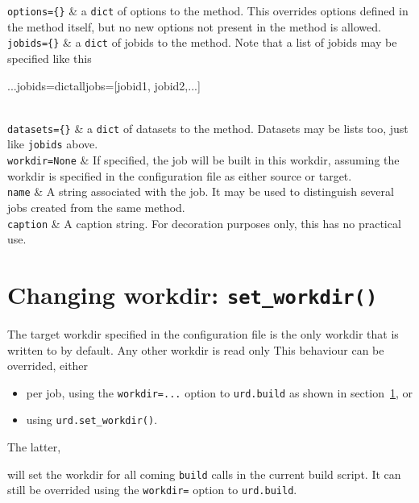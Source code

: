 \RPtwo \texttt{options=\{\}} & a \texttt{dict} of options to the method.
    This overrides options defined in the method itself, but no new
    options not present in the method is allowed.\\[2ex]

\RPtwo \texttt{jobids=\{\}} & a \texttt{dict} of jobids to the method.
    Note that a list of jobids may be specified like this\begin{python}
...jobids=dict{alljobs=[jobid1, jobid2,...]}
\end{python}
\\[2ex]

\RPtwo \texttt{datasets=\{\}} & a \texttt{dict} of datasets to the method.
    Datasets may be lists too, just like \texttt{jobids} above.\\[2ex]

\RPtwo \texttt{workdir=None} & If specified, the job will be built in
    this workdir, assuming the workdir is specified in the
    configuration file as either source or target.\\[2ex]

\RPtwo \texttt{name} & A string associated with the job.  It may be used
    to distinguish several jobs created from the same method.\\[2ex]
    \texttt{caption} & A caption string.  For decoration purposes
    only, this has no practical use.
\stoptabletwo


\section{Changing workdir:  \texttt{set\_workdir()}}
The target workdir specified in the configuration file is the only
workdir that is written to by default.  Any other workdir is read only
This behaviour can be overrided, either
\begin{itemize}
\item[] per job, using the \texttt{workdir=...} option to \texttt{urd.build} as shown in section~\ref{}, or
\item[] using \texttt{urd.set\_workdir()}.
\end{itemize}
The latter,
\begin{python}
def main(urd):
    urd.set_workdir(<workdir>)}
\end{python}
will set the workdir for all coming \texttt{build} calls in the
current build script.  It can still be overrided using
the \texttt{workdir=} option to \texttt{urd.build}.




